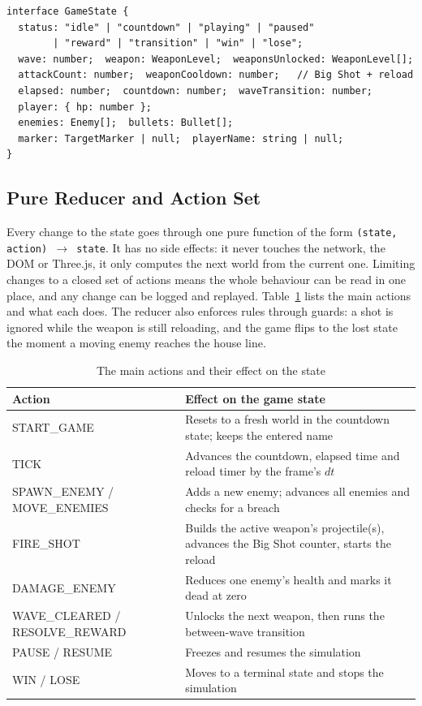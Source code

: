 \documentclass[12pt,a4paper]{report}
\begin{document}
\begin{verbatim}
interface GameState {
  status: "idle" | "countdown" | "playing" | "paused"
        | "reward" | "transition" | "win" | "lose";
  wave: number;  weapon: WeaponLevel;  weaponsUnlocked: WeaponLevel[];
  attackCount: number;  weaponCooldown: number;   // Big Shot + reload
  elapsed: number;  countdown: number;  waveTransition: number;
  player: { hp: number };
  enemies: Enemy[];  bullets: Bullet[];
  marker: TargetMarker | null;  playerName: string | null;
}
\end{verbatim}

\subsection{Pure Reducer and Action Set}

Every change to the state goes through one pure function of the form
\texttt{(state, action) $\to$ state}. It has no side effects: it never touches
the network, the DOM or Three.js, it only computes the next world from the
current one. Limiting changes to a closed set of actions means the whole
behaviour can be read in one place, and any change can be logged and replayed.
Table~\ref{tab:actions} lists the main actions and what each does. The reducer
also enforces rules through guards: a shot is ignored while the weapon is still
reloading, and the game flips to the lost state the moment a moving enemy reaches
the house line.

\begin{table}[htbp]
\centering
\caption{The main actions and their effect on the state}
\label{tab:actions}
\begin{tabular}{|p{3.6cm}|p{9.0cm}|}
\hline
Action & Effect on the game state \\
\hline
START\_GAME & Resets to a fresh world in the countdown state; keeps the entered name \\
\hline
TICK & Advances the countdown, elapsed time and reload timer by the frame's $dt$ \\
\hline
SPAWN\_ENEMY / MOVE\_ENEMIES & Adds a new enemy; advances all enemies and checks for a breach \\
\hline
FIRE\_SHOT & Builds the active weapon's projectile(s), advances the Big Shot counter, starts the reload \\
\hline
DAMAGE\_ENEMY & Reduces one enemy's health and marks it dead at zero \\
\hline
WAVE\_CLEARED / RESOLVE\_REWARD & Unlocks the next weapon, then runs the between-wave transition \\
\hline
PAUSE / RESUME & Freezes and resumes the simulation \\
\hline
WIN / LOSE & Moves to a terminal state and stops the simulation \\
\hline
\end{tabular}
\end{table}
\end{document}

